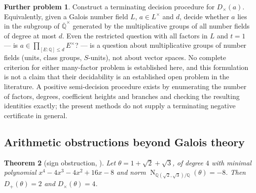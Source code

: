 \documentclass[11pt,a4paper]{article}
\newtheorem{theorem}{Theorem}[section]
\theoremstyle{definition}
\newtheorem{problem}[theorem]{Further problem}
\theoremstyle{remark}
\newcommand{\Q}{\mathbb{Q}}
\newcommand{\Qbar}{\overline{\Q}}
\newcommand{\Nm}{\operatorname{N}}
\newcommand{\Dp}{D_{+}}
\newcommand{\Dt}{D_{\times}}
\begin{document}
\begin{problem}
Construct a terminating decision procedure for $\Dt(a)$.  Equivalently, given a Galois number field $L$, $a\in L^\times$ and $d$, decide
whether $a$ lies in the subgroup of $\Qbar^\times$ generated by the multiplicative groups of all number
fields of degree at most $d$.  Even the restricted question with all factors in $L$ and $t=1$ --- is
$a\in\prod_{[E:\Q]\le d}E^\times$? --- is a question about multiplicative groups of number fields
(units, class groups, $S$-units), not about vector spaces.  No complete criterion for either
many-factor problem is established here, and this formulation is not a claim that their decidability
is an established open problem in the literature.  A positive semi-decision procedure exists by
enumerating the number of factors, degrees, coefficient heights and branches and checking the resulting
identities exactly; the present methods do not supply a terminating negative certificate in general.
\end{problem}

\subsection{Arithmetic obstructions beyond Galois theory}

\begin{theorem}[sign obstruction, \cite{r4}]\label{thm:sign}
Let $\theta=1+\sqrt2+\sqrt3$, of degree $4$ with minimal polynomial $x^4-4x^3-4x^2+16x-8$ and norm
$\Nm_{\Q(\sqrt2,\sqrt3)/\Q}(\theta)=-8$.  Then $\Dp(\theta)=2$ and $\Dt(\theta)=4$.
\end{theorem}
\end{document}
